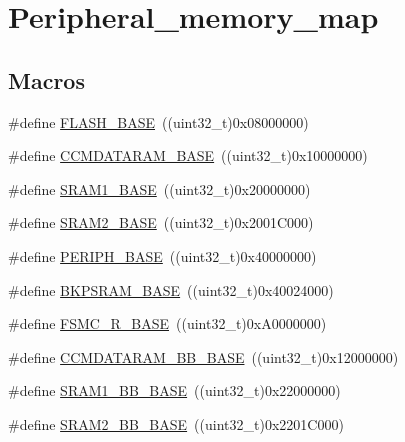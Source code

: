 \hypertarget{group___peripheral__memory__map}{\section{Peripheral\-\_\-memory\-\_\-map}
\label{group___peripheral__memory__map}
}
\subsection*{Macros}
\begin{DoxyCompactItemize}
\item 
\#define \hyperlink{group___peripheral__memory__map_ga23a9099a5f8fc9c6e253c0eecb2be8db}{F\-L\-A\-S\-H\-\_\-\-B\-A\-S\-E}~((uint32\-\_\-t)0x08000000)
\item 
\#define \hyperlink{group___peripheral__memory__map_gabea1f1810ebeac402164b42ab54bcdf9}{C\-C\-M\-D\-A\-T\-A\-R\-A\-M\-\_\-\-B\-A\-S\-E}~((uint32\-\_\-t)0x10000000)
\item 
\#define \hyperlink{group___peripheral__memory__map_ga7d0fbfb8894012dbbb96754b95e562cd}{S\-R\-A\-M1\-\_\-\-B\-A\-S\-E}~((uint32\-\_\-t)0x20000000)
\item 
\#define \hyperlink{group___peripheral__memory__map_gadbb42a3d0a8a90a79d2146e4014241b1}{S\-R\-A\-M2\-\_\-\-B\-A\-S\-E}~((uint32\-\_\-t)0x2001\-C000)
\item 
\#define \hyperlink{group___peripheral__memory__map_ga9171f49478fa86d932f89e78e73b88b0}{P\-E\-R\-I\-P\-H\-\_\-\-B\-A\-S\-E}~((uint32\-\_\-t)0x40000000)
\item 
\#define \hyperlink{group___peripheral__memory__map_ga52e57051bdf8909222b36e5408a48f32}{B\-K\-P\-S\-R\-A\-M\-\_\-\-B\-A\-S\-E}~((uint32\-\_\-t)0x40024000)
\item 
\#define \hyperlink{group___peripheral__memory__map_gaddf0e199dccba83272b20c9fb4d3aaed}{F\-S\-M\-C\-\_\-\-R\-\_\-\-B\-A\-S\-E}~((uint32\-\_\-t)0x\-A0000000)
\item 
\#define \hyperlink{group___peripheral__memory__map_gaf98d1f99ecd952ee59e80b345d835bb0}{C\-C\-M\-D\-A\-T\-A\-R\-A\-M\-\_\-\-B\-B\-\_\-\-B\-A\-S\-E}~((uint32\-\_\-t)0x12000000)
\item 
\#define \hyperlink{group___peripheral__memory__map_gac4c4f61082e4b168f29d9cf97dc3ca5c}{S\-R\-A\-M1\-\_\-\-B\-B\-\_\-\-B\-A\-S\-E}~((uint32\-\_\-t)0x22000000)
\item 
\#define \hyperlink{group___peripheral__memory__map_gac33cb6edadf184ab9860d77089503922}{S\-R\-A\-M2\-\_\-\-B\-B\-\_\-\-B\-A\-S\-E}~((uint32\-\_\-t)0x2201\-C000)

\end{DoxyCompactItemize}
